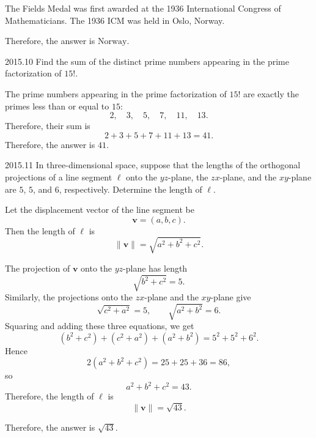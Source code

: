     \begin{solution}
        The Fields Medal was first awarded at the 1936 International Congress of Mathematicians. The
        1936 ICM was held in Oslo, Norway.

        Therefore, the answer is $\boxed{\text{Norway}}$.
    \end{solution}

    \begin{pastproblem}{2015.10}
        Find the sum of the distinct prime numbers appearing in the prime factorization of $15!$.
    \end{pastproblem}

    \begin{solution}
        The prime numbers appearing in the prime factorization of $15!$ are exactly the primes less
        than or equal to $15$:
        \[
            2,\quad 3,\quad 5,\quad 7,\quad 11,\quad 13.
        \]
        Therefore, their sum is
        \[
            2+3+5+7+11+13=41.
        \]
        Therefore, the answer is $\boxed{41}$.
    \end{solution}

    \begin{pastproblem}{2015.11}
        In three-dimensional space, suppose that the lengths of the orthogonal projections of a line
        segment $\ell$ onto the $yz$-plane, the $zx$-plane, and the $xy$-plane are $5$, $5$, and
        $6$, respectively. Determine the length of $\ell$.
    \end{pastproblem}

    \begin{solution}
        Let the displacement vector of the line segment be
        \[
            \mathbf{v}=(a,b,c).
        \]
        Then the length of $\ell$ is
        \[
            \|\mathbf{v}\|
            =
            \sqrt{a^2+b^2+c^2}.
        \]

        The projection of $\mathbf{v}$ onto the $yz$-plane has length
        \[
            \sqrt{b^2+c^2}=5.
        \]
        Similarly, the projections onto the $zx$-plane and the $xy$-plane give
        \[
            \sqrt{c^2+a^2}=5,
            \qquad
            \sqrt{a^2+b^2}=6.
        \]
        Squaring and adding these three equations, we get
        \[
            (b^2+c^2)+(c^2+a^2)+(a^2+b^2)
            =
            5^2+5^2+6^2.
        \]
        Hence
        \[
            2(a^2+b^2+c^2)=25+25+36=86,
        \]
        so
        \[
            a^2+b^2+c^2=43.
        \]
        Therefore, the length of $\ell$ is
        \[
            \|\mathbf{v}\|=\sqrt{43}.
        \]

        Therefore, the answer is $\boxed{\sqrt{43}}$.
    \end{solution}

